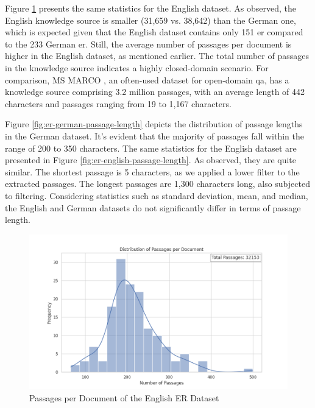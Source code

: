 Figure \ref{fig:er-english-passage-document} presents the same statistics for the English dataset. As observed, the English knowledge source is smaller (31,659 vs. 38,642) than the German one, which is expected given that the English dataset contains only 151 \gls{er} compared to the 233 German \gls{er}. Still, the average number of passages per document is higher in the English dataset, as mentioned earlier. The total number of passages in the knowledge source indicates a highly closed-domain scenario. For comparison, MS MARCO \cite{bajaj2016ms}, an often-used dataset for open-domain \gls{qa}, has a knowledge source comprising 3.2 million passages, with an average length of 442 characters and passages ranging from 19 to 1,167 characters.

Figure \ref{fig:er-german-passage-length} depicts the distribution of passage lengths in the German dataset. It's evident that the majority of passages fall within the range of 200 to 350 characters. The same statistics for the English dataset are presented in Figure \ref{fig:er-english-passage-length}. As observed, they are quite similar. The shortest passage is 5 characters, as we applied a lower filter to the extracted passages. The longest passages are 1,300 characters long, also subjected to filtering. Considering statistics such as standard deviation, mean, and median, the English and German datasets do not significantly differ in terms of passage length.


\begin{figure}[H]
    \centering
    \includegraphics[width=\textwidth]{Grafiken/Statistiken/IndexEnglish_Passages_Distribution.png}
    \caption{Passages per Document of the English ER Dataset}
    \label{fig:er-english-passage-document}
\end{figure}

